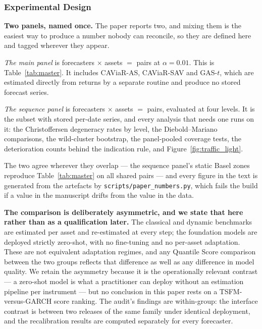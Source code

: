 \documentclass[preprint,11pt,authoryear]{elsarticle}
\newcommand{\1}{\boldsymbol{1}}
\begin{document}
\subsubsection{Experimental Design}
\label{sec:exp_design}

\textbf{Two panels, named once.} The paper reports two, and mixing them is the
easiest way to produce a number nobody can reconcile, so they are defined here
and tagged wherever they appear.

\emph{The main panel} is \nMainForecasters{} forecasters $\times$ \nMainAssets{}
assets $=$ \nMainPairs{} pairs at $\alpha = 0.01$. This is Table~\ref{tab:master}.
It includes CAViaR-AS, CAViaR-SAV and GAS-$t$, which are estimated directly from
returns by a separate routine and produce no stored forecast series.

\emph{The sequence panel} is \nSeqForecasters{} forecasters $\times$
\nMainAssets{} assets $=$ \nSeqPairs{} pairs, evaluated at four levels. It is the
subset with stored per-date series, and every analysis that needs one runs on it:
the Christoffersen degeneracy rates by level, the Diebold--Mariano comparisons,
the wild-cluster bootstrap, the panel-pooled coverage tests, the deterioration
counts behind the indication rule, and Figure~\ref{fig:traffic_light}.

The two agree wherever they overlap --- the sequence panel's static Basel zones
reproduce Table~\ref{tab:master} on all \nSeqPairs{} shared pairs --- and every
figure in the text is generated from the artefacts by
\texttt{scripts/paper\_numbers.py}, which fails the build if a value in the
manuscript drifts from the value in the data.

\textbf{The comparison is deliberately asymmetric, and we state that here rather than as a qualification later.} The classical and dynamic benchmarks are estimated per asset and re-estimated at every step; the foundation models are deployed strictly zero-shot, with no fine-tuning and no per-asset adaptation. These are not equivalent adaptation regimes, and any Quantile Score comparison between the two groups reflects that difference as well as any difference in model quality. We retain the asymmetry because it is the operationally relevant contrast --- a zero-shot model is what a practitioner can deploy without an estimation pipeline per instrument --- but no conclusion in this paper rests on a TSFM-versus-GARCH score ranking. The audit's findings are within-group: the interface contrast is between two releases of the same family under identical deployment, and the recalibration results are computed separately for every forecaster.
\end{document}
